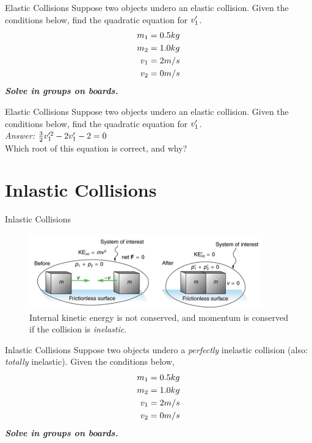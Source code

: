 \documentclass{beamer}
\begin{document}
\begin{frame}{Elastic Collisions}
Suppose two objects undero an elastic collision.  Given the conditions below, find the quadratic equation for $v_{\rm 1}'$.
\begin{align}
m_{\rm 1} &= 0.5 kg \\
m_{\rm 2} &= 1.0 kg \\
v_{\rm 1} &= 2 m/s \\
v_{\rm 2} &= 0 m/s
\end{align}
\textit{\textbf{Solve in groups on boards.}}
\end{frame}

\begin{frame}{Elastic Collisions}
Suppose two objects undero an elastic collision.  Given the conditions below, find the quadratic equation for $v_{\rm 1}'$. \\ \vspace{0.5cm}
\textit{Answer:} $\frac{3}{2}v_{\rm 1}'^2 - 2v_{\rm 1}' - 2 = 0$ \\
\vspace{0.5cm}
Which root of this equation is correct, and why?
\end{frame}

\section{Inlastic Collisions}

\begin{frame}{Inlastic Collisions}
\begin{figure}
\centering
\includegraphics[width=0.9\textwidth]{figures/inelastic.png}
\caption{\label{fig:inelastic} Internal kinetic energy is not conserved, and momentum is conserved if the collision is \textit{inelastic}.}
\end{figure}
\end{frame}

\begin{frame}{Inlastic Collisions}
Suppose two objects undero a \textit{perfectly} inelastic collision (also: \textit{totally} inelastic).  Given the conditions below,
\begin{align}
m_{\rm 1} &= 0.5 kg \\
m_{\rm 2} &= 1.0 kg \\
v_{\rm 1} &= 2 m/s \\
v_{\rm 2} &= 0 m/s
\end{align}
\textit{\textbf{Solve in groups on boards.}}
\end{frame}
\end{document}

